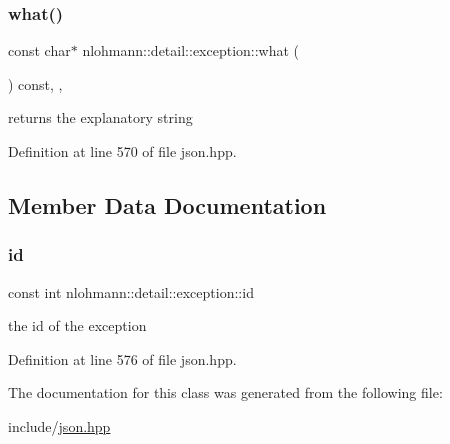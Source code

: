 \subsubsection{\texorpdfstring{what()}{what()}}
{\footnotesize\ttfamily const char$\ast$ nlohmann\+::detail\+::exception\+::what (\begin{DoxyParamCaption}{ }\end{DoxyParamCaption}) const\hspace{0.3cm}{\ttfamily [inline]}, {\ttfamily [override]}, {\ttfamily [noexcept]}}



returns the explanatory string 



Definition at line 570 of file json.\+hpp.



\subsection{Member Data Documentation}
\mbox{\label{classnlohmann_1_1detail_1_1exception_a0d4589a3fb54e81646d986c05efa3b9a}} 
\subsubsection{\texorpdfstring{id}{id}}
{\footnotesize\ttfamily const int nlohmann\+::detail\+::exception\+::id}



the id of the exception 



Definition at line 576 of file json.\+hpp.



The documentation for this class was generated from the following file\+:\begin{DoxyCompactItemize}
\item 
include/\hyperlink{json_8hpp}{json.\+hpp}\end{DoxyCompactItemize}
